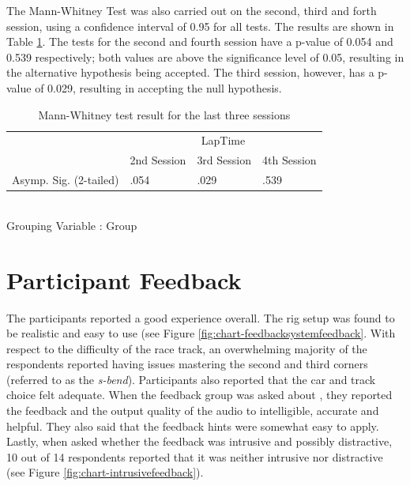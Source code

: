 The Mann-Whitney Test was also carried out on the second, third and forth session, using a confidence interval of 0.95 for all tests. The results are shown in Table \ref{table:Mann-Whitney-Sessions}. The tests for the second and fourth session have a p-value of 0.054 and 0.539 respectively; both values are above the significance level of 0.05, resulting in the alternative hypothesis being accepted. The third session, however, has a p-value of 0.029, resulting in accepting the null hypothesis.



\begin{table}[]
	\centering
	\begin{tabular}{|l|l|l|l|}
		\hline
		& \multicolumn{3}{c|}{LapTime}            \\ \cline{2-4} 
		& 2nd Session & 3rd Session & 4th Session \\ \hline
		Asymp. Sig. (2-tailed) & .054        & .029        & .539        \\ \hline
	\end{tabular}\\
	Grouping Variable : Group
	\caption[Mann-Whitney Test for last three Sessions]{Mann-Whitney test result for the last three sessions}
	\label{table:Mann-Whitney-Sessions}
\end{table}

\section{Participant Feedback}
\label{sec:eval-usersFeedback}
The participants reported a good experience overall. The rig setup was found to be realistic and easy to use (see Figure \ref{fig:chart-feedbacksystemfeedback}. With respect to the difficulty of the race track, an overwhelming majority of the respondents reported having issues mastering the second and third corners (referred to as the \emph{s-bend}). Participants also reported that the car and track choice felt adequate. When the feedback group was asked about \methodname, they reported the feedback and the output quality of the audio to intelligible, accurate and helpful. They also said that the feedback hints were somewhat easy to apply. Lastly, when asked whether the feedback was intrusive and possibly distractive, 10 out of 14 respondents reported that it was neither intrusive nor distractive (see Figure \ref{fig:chart-intrusivefeedback}).

